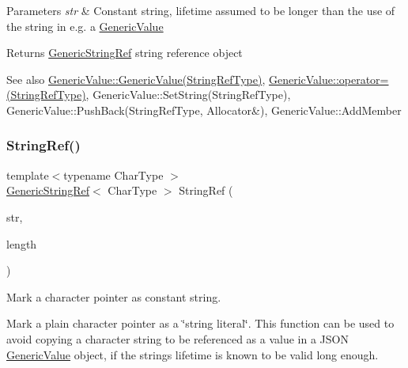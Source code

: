 \begin{DoxyParams}{Parameters}
{\em str} & Constant string, lifetime assumed to be longer than the use of the string in e.\+g. a \hyperlink{class_generic_value}{Generic\+Value} \\
\hline
\end{DoxyParams}
\begin{DoxyReturn}{Returns}
\hyperlink{struct_generic_string_ref}{Generic\+String\+Ref} string reference object
\end{DoxyReturn}
\begin{DoxySeeAlso}{See also}
\hyperlink{class_generic_value_abb2887958974fef1b2b5c8e32cc72ddb}{Generic\+Value\+::\+Generic\+Value(\+String\+Ref\+Type)}, \hyperlink{class_generic_value_a386708557555e6389184de608af5e6a6}{Generic\+Value\+::operator=(\+String\+Ref\+Type)}, Generic\+Value\+::\+Set\+String(\+String\+Ref\+Type), Generic\+Value\+::\+Push\+Back(\+String\+Ref\+Type, Allocator\&), Generic\+Value\+::\+Add\+Member 
\end{DoxySeeAlso}
\mbox{\label{struct_generic_string_ref_a578c51ab574a50a9c760b9da7c7562f2}} 
\subsubsection{\texorpdfstring{String\+Ref()}{StringRef()}\hspace{0.1cm}{\footnotesize\ttfamily [2/2]}}
{\footnotesize\ttfamily template$<$typename Char\+Type $>$ \\
\hyperlink{struct_generic_string_ref}{Generic\+String\+Ref}$<$ Char\+Type $>$ String\+Ref (\begin{DoxyParamCaption}\item[{const Char\+Type $\ast$}]{str,  }\item[{size\+\_\+t}]{length }\end{DoxyParamCaption})\hspace{0.3cm}{\ttfamily [related]}}



Mark a character pointer as constant string. 

Mark a plain character pointer as a \char`\"{}string literal\char`\"{}. This function can be used to avoid copying a character string to be referenced as a value in a J\+S\+ON \hyperlink{class_generic_value}{Generic\+Value} object, if the string\textquotesingle{}s lifetime is known to be valid long enough.

